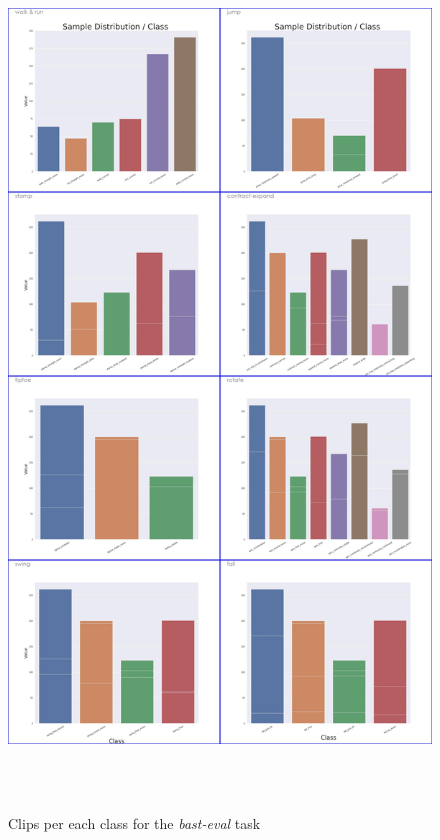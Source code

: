 \documentclass[extern,palatino]{cgMA}
\begin{document}
\begin{figure}[h]
\includegraphics[height={650pt}, width={470pt}]{Thesis/images/bast_eval_cls_dist.jpg}
\caption{Clips per each class for the \textit{bast-eval} task}
\label{bast_eval_cls_dist}
\end{figure}
\end{document}
